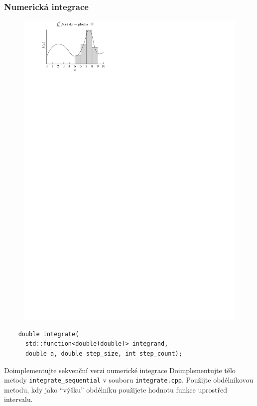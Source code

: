 \documentclass[usenames,dvipsnames,9pt]{beamer}
\begin{document}
{
\begin{frame}[fragile]
  \frametitle{Numerická integrace}
  
  \begin{figure}
    \centering\includegraphics{03/figs/integral.pdf}
  \end{figure}

  \begin{verbatim}
    double integrate(
      std::function<double(double)> integrand,
      double a, double step_size, int step_count);
  \end{verbatim}
\end{frame}

\begin{frame}[fragile]
  \begin{block}{Doimplementujte sekvenční verzi numerické integrace}
    Doimplementujte tělo metody \texttt{integrate\_sequential} v souboru \texttt{integrate.cpp}.
    Použijte obdélníkovou metodu, kdy jako ``výšku'' obdélníku použijete hodnotu funkce uprostřed intervalu.


\end{block}
\end{frame}}
\end{document}
